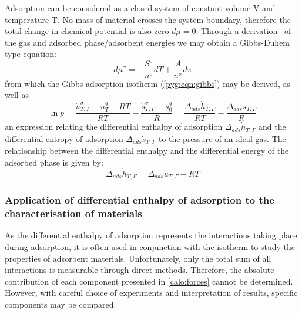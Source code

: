 Adsorption can be considered as a closed system of constant volume
V and temperature T. No mass of material crosses the system boundary,
therefore the total change in chemical potential is also
zero \(d\mu = 0\). Through
a derivation~\cite{rouquerolAdsorptionPowdersPorous2013} of the
gas and adsorbed phase/adsorbent energies we may obtain a 
Gibbs-Duhem type equation:
%
\begin{equation}
  d \mu^{\sigma} = - \frac{S^{\sigma}}{n^{\sigma}} dT + \frac{A}{n^{\sigma}} d \pi
\end{equation}
%
from which the Gibbs adsorption isotherm (\autoref{pyg:eqn:gibbs}) may
be derived, as well as 
%
\begin{equation}\label{calo:eqn:enthalpy}
 \ln p = \frac{\dot{u}_{T, \Gamma}^{\sigma} - u_T^g - RT}{RT} %
 - \frac{\dot{s}_{T, \Gamma}^{\sigma} - s^{g}_{0}}{R} %
 = \frac{\Delta_{ads} \dot{h}_{T, \Gamma}}{RT} - \frac{\Delta_{ads} \dot{s}_{T, \Gamma}}{R}
\end{equation}
%
an expression relating the differential enthalpy of adsorption 
\(\Delta_{ads} \dot{h}_{T, \Gamma}\) and
the differential entropy of adsorption \(\Delta_{ads} \dot{s}_{T, \Gamma}\)
to the pressure of an ideal gas. 
The relationship between the differential enthalpy and the differential energy
of the adsorbed phase is given by:
%
\begin{equation}
  \Delta_{ads} \dot{h}_{T, \Gamma} = \Delta_{ads} \dot{u}_{T, \Gamma} - RT
\end{equation}

\subsubsection{Application of differential enthalpy of adsorption to the characterisation of materials}

As the differential enthalpy of adsorption represents
the interactions taking place during adsorption, it is often
used in conjunction with the isotherm to study the properties 
of adsorbent materials.
Unfortunately, only the total sum of all interactions
is measurable through direct methods. Therefore, the 
absolute contribution of each component presented in 
\autoref{calo:forces} cannot be determined.
However, with careful choice of experiments and interpretation 
of results, specific components may be compared.

